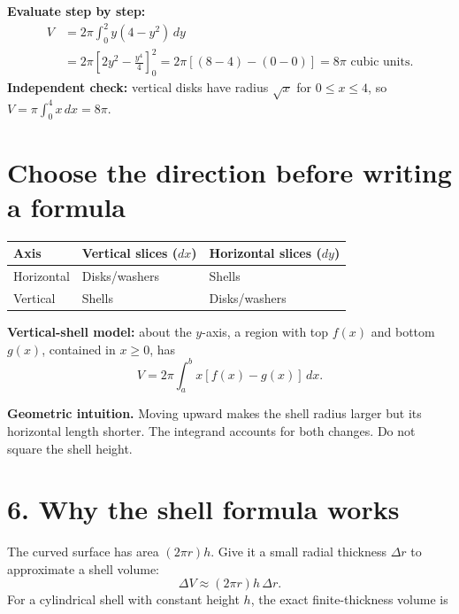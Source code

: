 \documentclass[11pt,letterpaper]{article}
\newcommand{\topic}[1]{\section*{#1}}
\newcommand{\intuition}[1]{\par\textbf{Geometric intuition.} #1\par}
\begin{document}
\textbf{Evaluate step by step:}
\begin{align*}
V&=2\pi\int_0^2y(4-y^2)\,dy\\
 &=2\pi\left[2y^2-\frac{y^4}{4}\right]_0^2
=2\pi\left[(8-4)-(0-0)\right]=\boxed{8\pi\text{ cubic units}}.
\end{align*}
\textbf{Independent check:} vertical disks have radius $\sqrt{x}$ for $0\leq x\leq4$, so $V=\pi\int_0^4x\,dx=8\pi$.
\topic{Choose the direction before writing a formula}
\begin{center}\begin{tabular}{lll}\toprule
Axis & Vertical slices ($dx$) & Horizontal slices ($dy$)\\\midrule
Horizontal & Disks/washers & Shells\\
Vertical & Shells & Disks/washers\\\bottomrule
\end{tabular}\end{center}
\textbf{Vertical-shell model:} about the $y$-axis, a region with top $f(x)$ and bottom $g(x)$, contained in $x\geq0$, has
\[V=2\pi\int_a^b x[f(x)-g(x)]\,dx.\]
\intuition{Moving upward makes the shell radius larger but its horizontal length shorter. The integrand accounts for both changes. Do not square the shell height.}
\newpage
\topic{6. Why the shell formula works}
\begin{center}\end{center}
The curved surface has area $(2\pi r)h$. Give it a small radial thickness $\Delta r$ to approximate a shell volume:
\[\Delta V\approx(2\pi r)h\,\Delta r.\]
For a cylindrical shell with constant height $h$, the exact finite-thickness volume is
\end{document}
